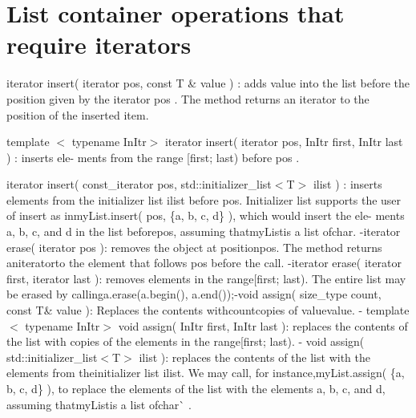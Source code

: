 \section*{List container operations that require iterators}


\begin{DoxyItemize}
\item {\ttfamily iterator insert( iterator pos, const T \& value )} \+: adds value into the list before the position given by the {\ttfamily iterator pos} . The method returns an {\ttfamily iterator} to the position of the inserted item.
\item {\ttfamily template $<$ typename In\+Itr$>$ iterator insert( iterator pos, In\+Itr first, In\+Itr last )} \+: inserts ele-\/ ments from the range {\ttfamily \mbox{[}first; last)} before {\ttfamily pos} .
\item {\ttfamily iterator insert( const\+\_\+iterator pos, std\+::initializer\+\_\+list$<$T$>$ ilist )} \+: inserts elements from the {\ttfamily initializer list ilist} before {\ttfamily pos}{\ttfamily . Initializer list supports the user of insert as in}my\+List.\+insert( pos, \{\textquotesingle{}a\textquotesingle{}, \textquotesingle{}b\textquotesingle{}, \textquotesingle{}c\textquotesingle{}, \textquotesingle{}d\textquotesingle{}\} ){\ttfamily , which would insert the ele-\/ ments a, b, c, and d in the list before}pos{\ttfamily , assuming that}my\+List{\ttfamily is a list of}char{\ttfamily . -\/}iterator erase( iterator pos ){\ttfamily \+: removes the object at position}pos{\ttfamily . The method returns an}iterator{\ttfamily to the element that follows pos before the call. -\/}iterator erase( iterator first, iterator last ){\ttfamily \+: removes elements in the range}\mbox{[}first; last){\ttfamily . The entire list may be erased by calling}a.\+erase(a.\+begin(), a.\+end());{\ttfamily  -\/}void assign( size\+\_\+type count, const T\& value ){\ttfamily \+: Replaces the contents with}count{\ttfamily copies of value}value{\ttfamily . -\/} template $<$ typename In\+Itr$>$ void assign( In\+Itr first, In\+Itr last ){\ttfamily \+: replaces the contents of the list with copies of the elements in the range}\mbox{[}first; last){\ttfamily . -\/} void assign( std\+::initializer\+\_\+list$<$\+T$>$ ilist ){\ttfamily \+: replaces the contents of the list with the elements from the}initializer list ilist{\ttfamily . We may call, for instance,}my\+List.\+assign( \{\textquotesingle{}a\textquotesingle{}, \textquotesingle{}b\textquotesingle{}, \textquotesingle{}c\textquotesingle{}, \textquotesingle{}d\textquotesingle{}\} ){\ttfamily , to replace the elements of the list with the elements a, b, c, and d, assuming that}my\+List{\ttfamily is a list of}char\`{} .
\end{DoxyItemize}

